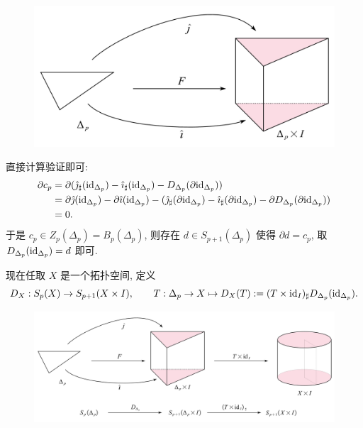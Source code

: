 \begin{Proof}
	\begin{figure}[htbp]
		\centering
		\includegraphics[width=0.4\linewidth]{figures/Sec10-3.png}
	\end{figure}
	直接计算验证即可:
	\[
		\begin{aligned}
			\partial c_p&=\partial(\hat{\jmath}_\sharp(\mathrm{id}_{\Delta_p})-\hat{\imath}_\sharp(\mathrm{id}_{\Delta_p})-D_{\Delta_p}(\partial\mathrm{id}_{\Delta_p}))\\
			&=\partial\hat{\jmath}(\mathrm{id}_{\Delta_p})-\partial\hat{\imath}(\mathrm{id}_{\Delta_p})-(\hat{\jmath}_\sharp(\partial\mathrm{id}_{\Delta_p})-\hat{\imath}_\sharp(\partial\mathrm{id}_{\Delta_p})-\partial D_{\Delta_p}(\partial\mathrm{id}_{\Delta_p}))\\
			&=0.
		\end{aligned}
	\]
	于是 $ c_p\in Z_p(\Delta_p)=B_p(\Delta_p) $, 则存在 $ d\in S_{p+1}(\Delta_p) $ 使得 $ \partial d=c_p $, 取 $ D_{\Delta_p}(\mathrm{id}_{\Delta_p})=d $ 即可.

	现在任取 $ X $ 是一个拓扑空间, 定义
	\[
		D_X : S_p(X)\to S_{p+1}(X\times I),\qquad T : \Delta_p\to X\mapsto D_X(T) :=(T\times\mathrm{id}_I)_\sharp D_{\Delta_p}(\mathrm{id}_{\Delta_p}).
	\]
	\begin{figure}[htbp]
		\centering
		\includegraphics[width=0.75\linewidth]{figures/Sec10-4.png}
	\end{figure}


\end{Proof}
